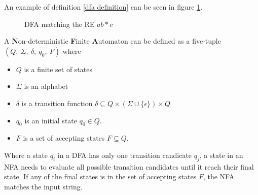 \documentclass[12pt]{article}
\theoremstyle{definition}
\begin{document}
An example of definition \ref{dfa definition} can be seen in figure \ref{dfa_simple}. \\

\begin{figure}[H]
  \begin{center}

	
	\caption{DFA matching the RE \underline{$ab*c$}}
	\label{dfa_simple}
  \end{center}
\end{figure}


\begin{definition} A \textbf{N}on-deterministic \textbf{F}inite \textbf{A}utomaton can be defined as a five-tuple $(Q,\ \Sigma,\ \delta,\ q_0,\ F)$ where

\begin{itemize}
	\item $Q$ is a finite set of states
	\item $\Sigma$ is an alphabet
	\item $\delta$ is a transition function $\delta \subseteq Q \times (\Sigma \cup \{\epsilon\}) \times Q$
	\item $q_0$ is an initial state $q_0 \in Q$.
	\item $F$ is a set of accepting states $F \subseteq Q$.
\end{itemize}

\label{nfa definition}
\end{definition}

Where a state $q_i$ in a DFA has only one transition candicate $q_j$, a state in an NFA needs to evaluate all possible transition candidates until it reach their final state. If any of the final states is in the set of accepting states $F$, the NFA matches the input string.
\end{document}
